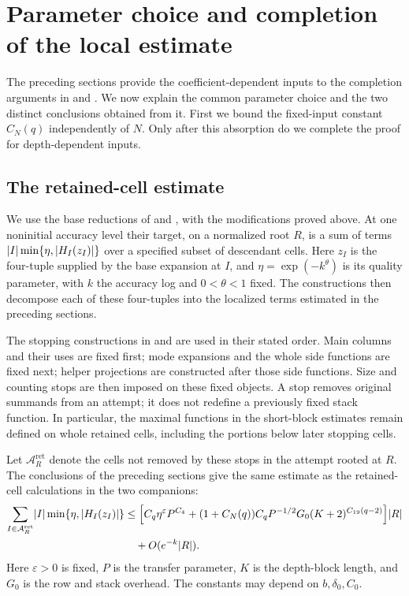 \section{Parameter choice and completion of the local estimate}\label{sec:completion}

The preceding sections provide the coefficient-dependent inputs to
the completion arguments in \cite[Section~10]{H} and
\cite[Section~7]{V}. We now explain the common parameter choice and
the two distinct conclusions obtained from it. First we bound the
fixed-input constant $C_N(q)$ independently of $N$. Only after this
absorption do we complete the proof for depth-dependent inputs.

\subsection{The retained-cell estimate}
We use the base reductions of \cite[Proposition~5.8]{H} and
\cite[Proposition~5.6]{V}, with the modifications proved above.
At one noninitial accuracy level their target, on a normalized root
$R$, is a sum of terms
$\lvert I\rvert\min\{\eta,\lvert H_I(z_I)\rvert\}$ over a specified subset of
descendant cells. Here $z_I$ is the four-tuple supplied by the base
expansion at $I$, and $\eta=\exp(-k^\theta)$ is its quality parameter,
with $k$ the accuracy log and $0<\theta<1$ fixed. The constructions
then decompose each of these four-tuples into the localized terms
estimated in the preceding sections.

The stopping constructions in \cite[Section~10.1]{H} and
\cite[Section~7.1]{V} are used in their stated order. Main columns and
their uses are fixed first; mode expansions and the whole side
functions are fixed next; helper projections are constructed after
those side functions. Size and counting stops are then imposed on
these fixed objects. A stop removes original summands from an
attempt; it does not redefine a previously fixed stack function.
In particular, the maximal functions in the short-block estimates
remain defined on whole retained cells, including the portions below
later stopping cells.

Let $\mathcal A_R^{\mathrm{ret}}$ denote the cells not removed by
these stops in the attempt rooted at $R$. The conclusions of the
preceding sections give the same estimate as the retained-cell
calculations in the two companions:
\begin{equation}\label{eq:retained}
\begin{aligned}
 \sum_{I\in\mathcal A_R^{\mathrm{ret}}}\lvert I\rvert
       \min\{\eta,\lvert H_I(z_I)\rvert\}
 &\le \Bigl[C_q\eta^{\varepsilon}P^{C_4}
       +(1+C_N(q))C_qP^{-1/2}G_0
                    (K+2)^{C_{19}(q-2)}\Bigr]\lvert R\rvert\\
 &\quad+O(e^{-k}\lvert R\rvert).
\end{aligned}
\end{equation}
Here $\varepsilon>0$ is fixed, $P$ is the transfer parameter, $K$
is the depth-block length, and $G_0$ is the row and stack overhead.
The constants may depend on $b,\delta_0,C_0$.

